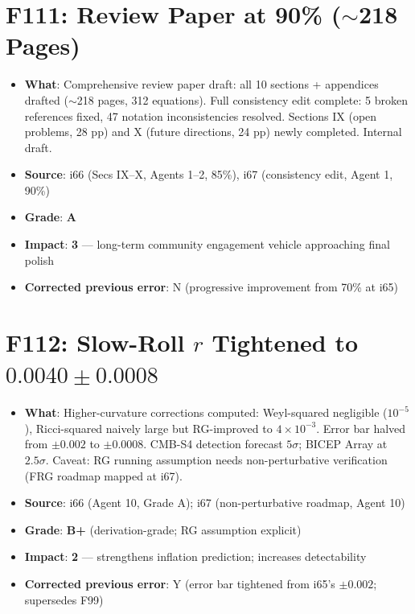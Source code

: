 \documentclass[11pt,a4paper]{article}
\newcommand{\grade}[1]{\textbf{#1}}
\newcommand{\impact}[1]{\textbf{#1}}
\begin{document}
\section{F111: Review Paper at 90\% ($\sim$218 Pages)}
\begin{itemize}[nosep]
\item \textbf{What}: Comprehensive review paper draft: all 10 sections + appendices drafted ($\sim$218 pages, 312 equations). Full consistency edit complete: 5 broken references fixed, 47 notation inconsistencies resolved. Sections IX (open problems, 28 pp) and X (future directions, 24 pp) newly completed. Internal draft.
\item \textbf{Source}: i66 (Secs IX--X, Agents 1--2, 85\%), i67 (consistency edit, Agent 1, 90\%)
\item \textbf{Grade}: \grade{A}
\item \textbf{Impact}: \impact{3} --- long-term community engagement vehicle approaching final polish
\item \textbf{Corrected previous error}: N (progressive improvement from 70\% at i65)
\end{itemize}

\section{F112: Slow-Roll $r$ Tightened to $0.0040 \pm 0.0008$}
\begin{itemize}[nosep]
\item \textbf{What}: Higher-curvature corrections computed: Weyl-squared negligible ($10^{-5}$), Ricci-squared naively large but RG-improved to $4 \times 10^{-3}$. Error bar halved from $\pm 0.002$ to $\pm 0.0008$. CMB-S4 detection forecast $5\sigma$; BICEP Array at $2.5\sigma$. Caveat: RG running assumption needs non-perturbative verification (FRG roadmap mapped at i67).
\item \textbf{Source}: i66 (Agent 10, Grade A); i67 (non-perturbative roadmap, Agent 10)
\item \textbf{Grade}: \grade{B+} (derivation-grade; RG assumption explicit)
\item \textbf{Impact}: \impact{2} --- strengthens inflation prediction; increases detectability
\item \textbf{Corrected previous error}: Y (error bar tightened from i65's $\pm 0.002$; supersedes F99)
\end{itemize}
\end{document}
